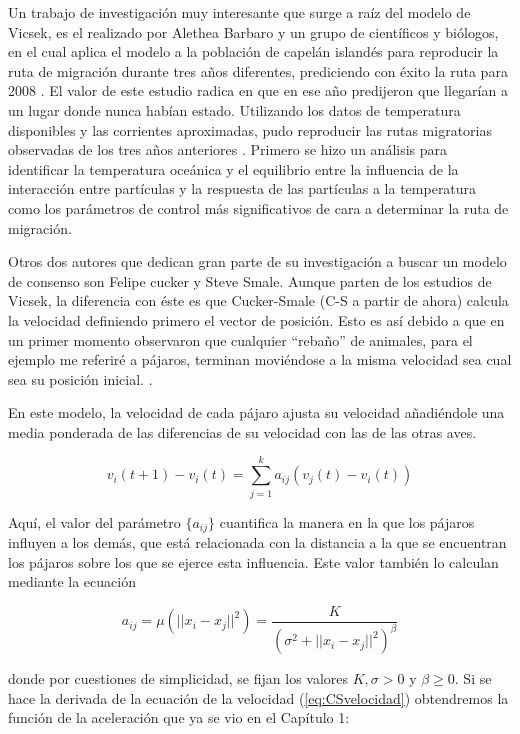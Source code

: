  Un trabajo de investigación muy interesante que surge a raíz del modelo de Vicsek, es el realizado por Alethea Barbaro y un grupo de científicos y biólogos, en el cual aplica el modelo a la población de capelán islandés para reproducir la ruta de migración durante tres años diferentes, prediciendo con éxito la ruta para 2008 \cite{barbaroModellingSimulations}. El valor de este estudio radica en que en ese año predijeron que llegarían a un lugar donde nunca habían estado. Utilizando los datos de temperatura disponibles y las corrientes aproximadas, pudo reproducir las rutas migratorias observadas de los tres años anteriores \cite{barbaro2009simulations}. Primero se hizo un análisis para identificar la temperatura oceánica y el equilibrio entre la influencia de la interacción entre partículas y la respuesta de las partículas a la temperatura como los parámetros de control más significativos de cara a determinar la ruta de migración.
 
 Otros dos autores que dedican gran parte de su investigación a buscar un modelo de consenso son Felipe cucker y Steve Smale.  Aunque parten de los estudios de Vicsek, la diferencia con éste es que Cucker-Smale (C-S a partir de ahora) calcula la velocidad definiendo primero el vector de posición. Esto es así debido a que en un primer momento observaron que cualquier ``rebaño'' de animales, para el ejemplo me referiré a pájaros, terminan moviéndose a la misma velocidad sea cual sea su posición inicial. \cite{cucker2007emergent}.
 
 En este modelo, la velocidad de cada pájaro ajusta su velocidad añadiéndole una media ponderada de las diferencias de su velocidad con las de las otras aves. 
 
 \begin{equation}\label{eq:CSvelocidad}
     v_{i}(t+1)-v_{i}(t)=\sum_{j=1}^k a_{ij}(v_{j}(t)-v_{i}(t))
 \end{equation}
 
 Aquí, el valor del parámetro $\{a_{ij}\}$ cuantifica la manera en la que los pájaros influyen a los demás, que está relacionada con la distancia a la que se encuentran los pájaros sobre los que se ejerce esta influencia. Este valor también lo calculan mediante la ecuación 
 
 \begin{equation}
     \label{eq:CSaij}
     a_{ij} = \mu(||x_{i}-x_{j}||^2) = \frac{K}{(\sigma^2 + ||x_i-x_j||^2)^\beta}
 \end{equation}
 
 donde por cuestiones de simplicidad, se fijan los valores $K,\sigma>0$ y $\beta \ge 0$. Si se hace la derivada de la ecuación de la velocidad (\ref{eq:CSvelocidad}) obtendremos la función de la aceleración que ya se vio en el Capítulo 1:
 
